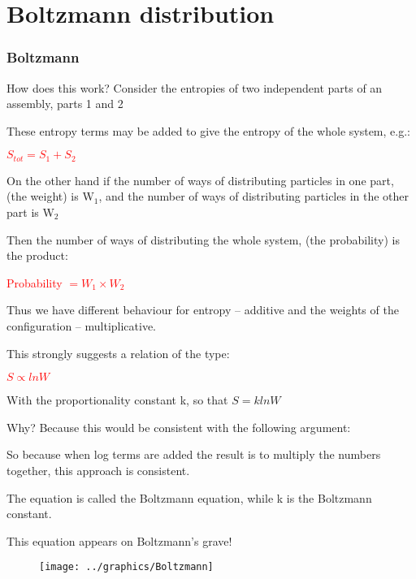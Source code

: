 \documentclass[ignorenonframetext]{beamer}
\begin{document}
\section{Boltzmann distribution}

\begin{frame}[allowframebreaks]
\frametitle{Boltzmann}
How does this work? \quad Consider the entropies of two independent parts of an assembly, parts 1 and 2
 
\smallskip These entropy terms may be added to give the entropy of the whole system, e.g.:
 
\begin{center} \textcolor{red}{\(S_{tot} = S_1 + S_2\)} \end{center}
 
On the other hand if the number of ways of distributing particles in one part, (the weight) is W\(_1\), and the number of ways of distributing particles in the other part is W\(_2\)
 
Then the number of ways of distributing the whole system, (the probability) is the product:
\begin{center} \textcolor{red}{Probability \(= W_1 \times W_2\)} \end{center}
Thus we have different behaviour for entropy -- additive and the weights of the configuration -- multiplicative.


This strongly suggests a relation of the type:
\begin{center} \textcolor{red}{\(S \propto lnW \)} \end{center}

With the proportionality constant k, so that \(S = klnW\)

Why? Because this would be consistent with the following argument:\smallskip

\smallskip

So because when log terms are added the result is to multiply the numbers together, this approach is consistent.

The equation is called the Boltzmann equation, while k is the Boltzmann constant.

This equation appears on Boltzmann's grave!
\begin{figure}
\texttt{[image: ../graphics/Boltzmann]}
\end{figure}

\end{frame}
\end{document}
